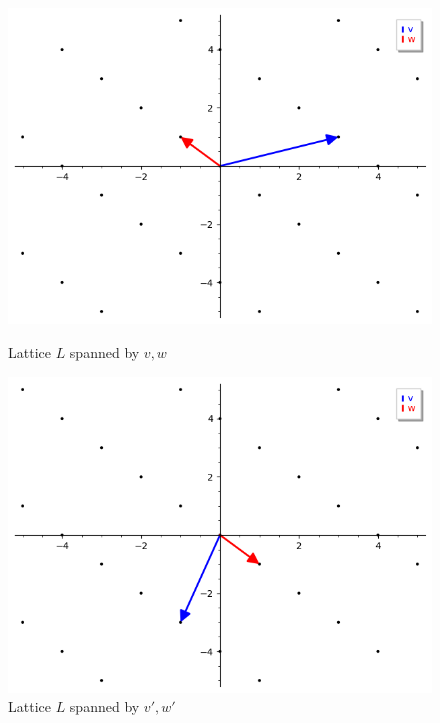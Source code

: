 \documentclass[a4paper,12pt]{report}
\begin{document}
\begin{figure}[!tbp]
    \begin{minipage}[b]{0.50\textwidth}
        \includegraphics[width=\textwidth]{./img/lattice_b0.png}
        \caption{Lattice $L$ spanned by $v, w$}
        \label{fig:lattice0}
    \end{minipage}
    \hspace{\fill}
    \hspace{\fill}
    \hspace{\fill}
    \hspace{\fill}
    \hspace{\fill}
    \begin{minipage}[b]{0.50\textwidth}
        \includegraphics[width=\textwidth]{./img/lattice_b1.png}
        \caption{Lattice $L$ spanned by $v', w'$}
        \label{fig:lattice1}
    \end{minipage}
\end{figure}
\end{document}
